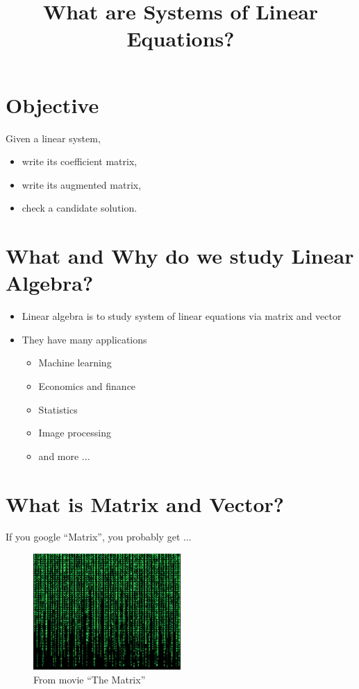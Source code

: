 \documentclass{beamer}
\title %
{What are Systems of Linear Equations?}
\author{}
\institute{WPI} %
\theoremstyle{definition}
\theoremstyle{theorem}
\begin{document}
\begin{frame}
  \titlepage
\end{frame}

\section{Objective}
\begin{frame}
 Given a linear system, 
\begin{itemize}
 \item write its coefficient matrix, 
 \item write its augmented matrix,
 \item check a candidate solution.
\end{itemize}
\end{frame}

\section{What and Why do we study Linear Algebra? }

\begin{frame}

\begin{itemize}
 \item Linear algebra is to study system of linear equations via matrix and vector
 \item They have many applications

\begin{itemize}
 \item  Machine learning
 \item Economics and finance 
 \item Statistics
 \item Image processing
 \item and more ...
\end{itemize}

\end{itemize}

\end{frame}



\section{What is Matrix and Vector?}

\begin{frame}
 {If you google ``Matrix'', you probably get ...}
 \begin{figure}
  \includegraphics[width= 0.5\textwidth]{matrix.jpg}
  \caption{From movie ``The Matrix''}
  \label{fig:matrix}
\end{figure}
\end{frame}
\end{document}
